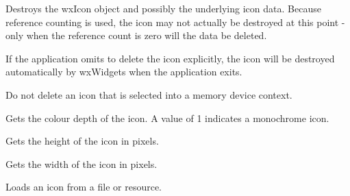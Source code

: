 \label{wxicondtor}


Destroys the wxIcon object and possibly the underlying icon data.
Because reference counting is used, the icon may not actually be
destroyed at this point - only when the reference count is zero will the
data be deleted.

If the application omits to delete the icon explicitly, the icon will be
destroyed automatically by wxWidgets when the application exits.

Do not delete an icon that is selected into a memory device context.

\label{wxicongetdepth}


Gets the colour depth of the icon. A value of 1 indicates a
monochrome icon.

\label{wxicongetheight}


Gets the height of the icon in pixels.

\label{wxicongetwidth}


Gets the width of the icon in pixels.



\label{wxiconloadfile}


Loads an icon from a file or resource.




